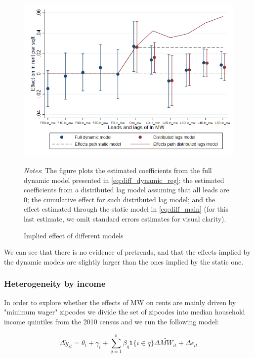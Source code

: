    \begin{figure}[h!] \centering
        \caption{Implied effect of different models}
        \label{fig:fd_models}
        \includegraphics[width=0.75\linewidth]{analysis/first_differences/output/fd_models.png}
        \begin{minipage}{.95\textwidth} \footnotesize
			\vspace{2mm} 
			\textit{Notes}: The figure plots the estimated coefficients from the full dynamic model presented in \autoref{eq:diff_dynamic_reg}; the estimated coefficients from a distributed lag model assuming that all leads are 0; the cumulative effect for such distributed lag model; and the effect estimated through the static model in \autoref{eq:diff_main} (for this last estimate, we omit standard errors estimates for visual clarity). 
		\end{minipage}
    \end{figure}
    
    We can see that there is no evidence of pretrends, and that the effects implied by the dynamic models are slightly larger than the ones implied by the static one.  
    
    
    \subsubsection{Heterogeneity by income}
    
    In order to explore whether the effects of MW on rents are mainly driven by "minimum wager" zipcodes we divide the set of zipcodes into median household income quintiles from the 2010 census and we run the following model:
    
    \begin{equation}\label{eq:diff_main_hetero}
            \Delta \tilde{y}_{it} = \theta_t + \gamma_i + \sum_{q=1}^5 \beta_q \mathds{1}\{i\in q\} \Delta \tilde{MW}_{it}+ \Delta \epsilon_{it}
    \end{equation}
    
